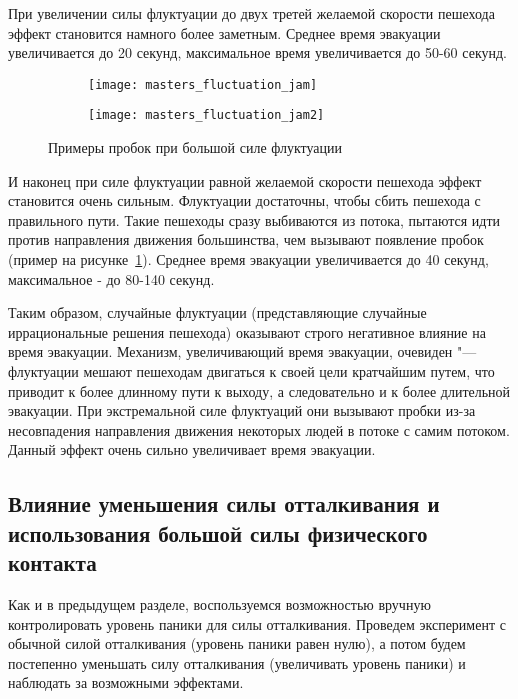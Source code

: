 При увеличении силы флуктуации до двух третей желаемой скорости пешехода эффект становится намного более заметным.
Среднее время эвакуации увеличивается до 20 секунд, максимальное время увеличивается до 50-60 секунд.

\begin{figure}[ht!]
  \centering
  \begin{subfigure}[!htb]{0.45\textwidth}
    \centering
    \texttt{[image: masters\_fluctuation\_jam]}
    \caption{}
  \end{subfigure}
  \begin{subfigure}[!htb]{0.45\textwidth}
    \centering
    \texttt{[image: masters\_fluctuation\_jam2]}
    \caption{}
  \end{subfigure}
  \caption{Примеры пробок при большой силе флуктуации}
  \label{sec:results:fluctuation:jam}
\end{figure}

И наконец при силе флуктуации равной желаемой скорости пешехода эффект становится очень сильным.
Флуктуации достаточны, чтобы сбить пешехода с правильного пути.
Такие пешеходы сразу выбиваются из потока, пытаются идти против направления движения большинства, чем вызывают появление пробок (пример на рисунке~\ref{sec:results:fluctuation:jam}).
Среднее время эвакуации увеличивается до 40 секунд, максимальное - до 80-140 секунд.

Таким образом, случайные флуктуации (представляющие случайные иррациональные решения пешехода) оказывают строго негативное влияние на время эвакуации.
Механизм, увеличивающий время эвакуации, очевиден "--- флуктуации мешают пешеходам двигаться к своей цели кратчайшим путем,
что приводит к более длинному пути к выходу, а следовательно и к более длительной эвакуации.
При экстремальной силе флуктуаций они вызывают пробки из-за несовпадения направления движения некоторых людей в потоке с самим потоком.
Данный эффект очень сильно увеличивает время эвакуации.

\subsection{Влияние уменьшения силы отталкивания и использования большой силы физического контакта}
\label{sec:results:repulsion}

Как и в предыдущем разделе, воспользуемся возможностью вручную контролировать уровень паники для силы отталкивания.
Проведем эксперимент с обычной силой отталкивания (уровень паники равен нулю), а потом будем постепенно уменьшать силу отталкивания (увеличивать уровень паники)
и наблюдать за возможными эффектами.

